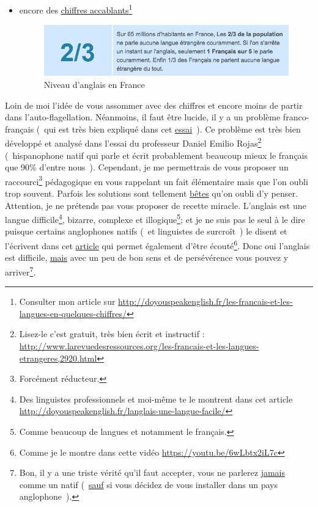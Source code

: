\begin{itemize}
\begin{figure}[h]
    \label{fig:2}
  \end{figure}
\item encore des
  \href{http://doyouspeakenglish.fr/les-francais-et-les-langues-en-quelques-chiffres/}{chiffres
    accablants}\footnote{Consulter mon article sur \url{http://doyouspeakenglish.fr/les-francais-et-les-langues-en-quelques-chiffres/}}
   
  \begin{figure}[h]
    \centering
    \caption[L'anglais en France]{Niveau d'anglais en France}\vspace{.1cm}
    \includegraphics[scale=.725]{../img/french-english-level-in-france}
    
    \label{fig:3}
  \end{figure}
\end{itemize}
Loin de moi l'idée de vous assommer avec des chiffres et encore moins
de partir dans l'auto-flagellation. Néanmoins, il faut être lucide, il
y a un problème franco-français (~qui est très bien expliqué dans cet
\href{http://www.larevuedesressources.org/les-francais-et-les-langues-etrangeres,2920.html}{essai}~). 
Ce problème est très bien développé et analysé dans l'essai du
professeur Daniel Emilio Rojas\footnote{Lisez-le c'est gratuit, très
  bien écrit et instructif : \url{http://www.larevuedesressources.org/les-francais-et-les-langues-etrangeres,2920.html}} (~hispanophone natif qui parle et écrit
probablement beaucoup mieux le français que 90\% d'entre
nous~). Cependant, je me permettrais de vous proposer un raccourci\footnote{Forcément réducteur.} pédagogique en vous rappelant un fait
élémentaire mais que l'on oubli trop souvent. Parfois les solutions
sont tellement \underline{bêtes} qu'on oubli d'y penser. Attention, je ne
prétends pas vous proposer de recette miracle. L'anglais est une
langue difficile\footnote{Des linguistes professionnels et moi-même te
  le montrent dans cet article \url{http://doyouspeakenglish.fr/langlais-une-langue-facile/} }, bizarre, complexe et
illogique\footnote{Comme beaucoup de langues et notamment le
  français.}; et je ne suis pas le seul à le dire puisque certains anglophones natifs (~et
linguistes de surcroît~) le disent et l'écrivent dans cet \href{http://doyouspeakenglish.fr/langlais-une-langue-facile/}{article} qui permet également d'être
écouté\footnote{Comme je le montre dans cette vidéo
  \url{https://youtu.be/6wLbtx2iL7c}}. Donc oui l'anglais est
difficile, \underline{mais} avec un peu de bon sens et de persévérence
vous pouvez y arriver\footnote{Bon, il y a une triste vérité qu'il
  faut accepter, vous ne parlerez \underline{jamais} comme un natif (~\underline{sauf}
  si vous décidez de vous installer dans un pays anglophone~).}. 

